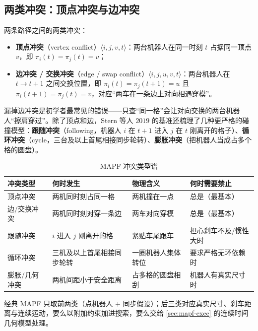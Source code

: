 \subsection{两类冲突：顶点冲突与边冲突}
\label{sec:mapf-conflicts}

\begin{definition}[顶点冲突与边冲突]\label{def:mapf-conflict-types}
两条路径之间的两类冲突\cite{stern2019mapf}：
\begin{itemize}
  \item \textbf{顶点冲突}（vertex conflict）$\langle i,j,v,t\rangle$：两台机器人在同一时刻 $t$ 占据同一顶点 $v$，即 $\pi_i(t)=\pi_j(t)=v$；
  \item \textbf{边冲突 / 交换冲突}（edge / swap conflict）$\langle i,j,u,v,t\rangle$：两台机器人在 $t\to t{+}1$ 之间交换位置，即 $\pi_i(t)=\pi_j(t{+}1)=u$ 且 $\pi_i(t{+}1)=\pi_j(t)=v$，对应“两车在一条边上对向相遇穿模”。
\end{itemize}
\end{definition}

漏掉边冲突是初学者最常见的错误——只查“同一格”会让对向交换的两台机器人“擦肩穿过”。除了顶点和边，Stern 等人 $2019$ 的基准还梳理了几种更严格的碰撞模型\cite{stern2019mapf}：\textbf{跟随冲突}（following，机器人 $i$ 在 $t{+}1$ 进入 $j$ 在 $t$ 刚离开的格子）、\textbf{循环冲突}（cycle，三台及以上首尾相接同步轮转）、\textbf{膨胀冲突}（把机器人当成占多个格的圆盘）。

\begin{table}[H]\centering\small
\caption{MAPF 冲突类型谱}
\label{tab:mapf-conflict-spectrum}
\begin{tabular}{llll}
\toprule
冲突类型 & 何时发生 & 物理含义 & 何时需要禁止 \\
\midrule
顶点冲突 & 两机同时刻占同一格 & 两机撞在一点 & 总是（最基本） \\
边/交换冲突 & 两机同时刻对穿一条边 & 两车对向穿模 & 总是（最基本） \\
跟随冲突 & $i$ 进入 $j$ 刚离开的格 & 紧贴车尾跟车 & 担心刹车不及/惯性大时 \\
循环冲突 & 三机及以上首尾相接同步轮转 & 一圈机器人集体转位 & 要求严格无环依赖时 \\
膨胀/几何冲突 & 两机间距小于安全距离 & 占多格的圆盘相刮 & 机器人有真实尺寸时 \\
\bottomrule
\end{tabular}
\end{table}

经典 MAPF 只取前两类（点机器人 $+$ 同步假设）；后三类对应真实尺寸、刹车距离与连续运动，要么以附加约束加进搜索，要么交给 \cref{sec:mapf-exec} 的连续时间几何模型处理。

